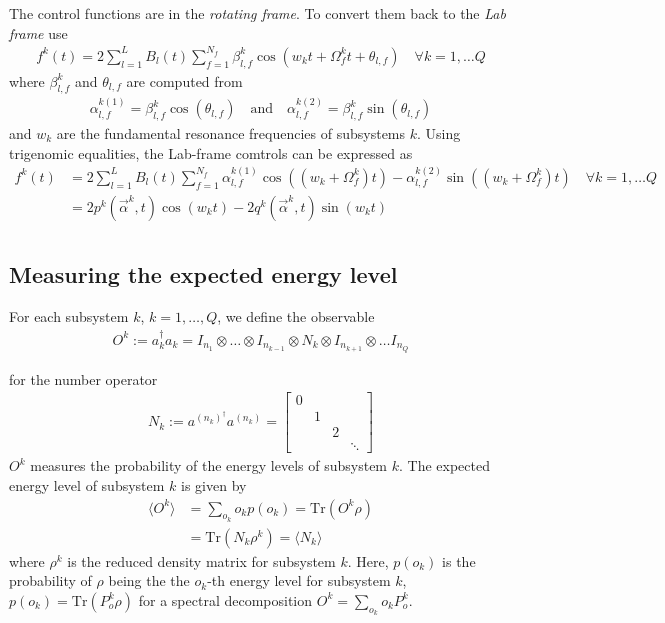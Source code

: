 \documentclass[letterpaper]{article}
\begin{document}
The control functions are in the \textit{rotating frame}. To convert them back to the \textit{Lab frame} use
\begin{align}
  f^k(t) = 2 \sum_{l=1}^L B_l(t) \sum_{f=1}^{N_f} \beta_{l,f}^k \cos(w_k t + \Omega_f^k t + \theta_{l,f}) \quad \forall k=1,\dots Q
\end{align}
where $\beta_{l,f}^k$ and $\theta_{l,f}$ are computed from
\begin{align}
  \alpha_{l,f}^{k(1)} = \beta_{l,f}^k \cos(\theta_{l,f}) \quad \text{and} \quad \alpha_{l,f}^{k(2)} = \beta_{l,f}^k \sin(\theta_{l,f})
\end{align}
and $w_k$ are the fundamental resonance frequencies of subsystems $k$. Using trigenomic equalities, the Lab-frame comtrols can be expressed as
\begin{align}
  f^k(t) &= 2 \sum_{l=1}^L B_l(t) \sum_{f=1}^{N_f} \alpha_{l,f}^{k(1)} \cos((w_k + \Omega_f^k) t) - \alpha_{l,f}^{k(2)}\sin((w_k + \Omega_f^k) t) \quad \forall k=1,\dots Q \\
         &= 2 p^k(\vec{\alpha}^k, t) \cos(w_k t) - 2 q^k(\vec{\alpha}^k, t)\sin(w_k t) \\
\end{align}


\subsection{Measuring the expected energy level}\label{sec:expectedenergy}
For each subsystem $k$, $k=1,\dots, Q$, we define the observable 
\begin{align}
  O^k := a_k^\dag a_k  = I_{n_1} \otimes \dots \otimes I_{n_{k-1}} \otimes  N_k \otimes I_{n_{k+1}} \otimes \dots I_{n_Q} 
\end{align}
       
       \quad
for the number operator 
\begin{align}
  N_k := a^{(n_k)^\dag} a^{(n_k)} = \begin{bmatrix} 
   0 &    &    & \\
     &  1 &    &\\
     &    &  2 &\\
     &    &    & \ddots 
  \end{bmatrix}
\end{align}
$O^k$ measures the probability of the energy levels of subsystem $k$. The expected energy level of subsystem $k$ is given by 
\begin{align}
  \langle O^k \rangle &= \sum_{o_k} o_k p(o_k)  = \mbox{Tr}(O^k\rho) \\
   & = \mbox{Tr}(N_k \rho^k)  = \langle N_k\rangle
\end{align}
where $\rho^k$ is the reduced density matrix for subsystem $k$. Here, $p(o_k)$ is the probability of $\rho$ being the the $o_k$-th energy level for subsystem $k$, $p(o_k) = \mbox{Tr}(P^k_o \rho)$ for a spectral decomposition $O^k = \sum_{o_k} o_kP^k_o$. 
\end{document}
